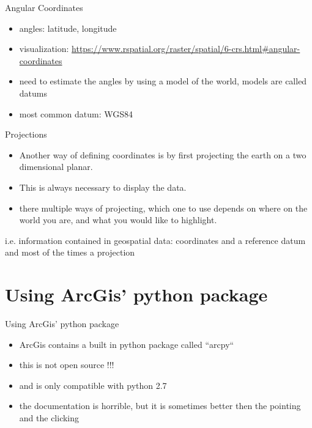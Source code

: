 \begin{frame}{Angular Coordinates}
\begin{itemize}
	\item angles: latitude, longitude
	\item visualization: 
	\url{https://www.rspatial.org/raster/spatial/6-crs.html#angular-coordinates}
	\item need to estimate the angles by using a model of the world, models are called \alert{datums}
	\item most common datum: WGS84 
\end{itemize}
\end{frame}

\begin{frame}{Projections}
	\hspace{4pt}
	\begin{itemize}
		\item Another way of defining coordinates is by first projecting the earth on a two dimensional planar.
		\item This is always necessary to display the data.
		\item there multiple ways of projecting, which one to use depends on where on the world you are, and what you would like to highlight.
	\end{itemize}

\pause
\alert{i.e. information contained in geospatial data: coordinates and a reference datum and most of the times a projection}
\end{frame}

\section{Using ArcGis' python package}

\begin{frame}{Using ArcGis' python package}
	\begin{itemize}
		\item ArcGis contains a built in python package called ``arcpy``
		\item this is not open source !!!
		\item and is only compatible with python 2.7
		\item the documentation is horrible, but it is sometimes better then the pointing and the clicking	
	\end{itemize}
\end{frame}

